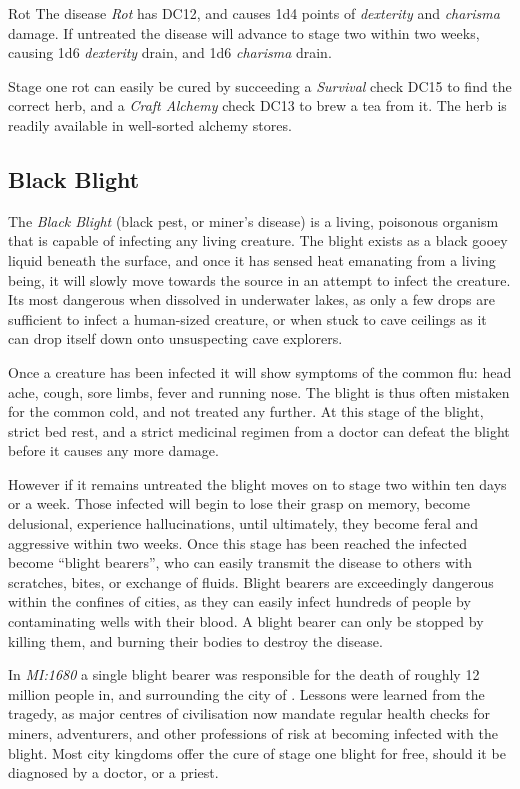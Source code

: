 \begin{35e}{Rot}
  The disease \emph{Rot} has DC12, and causes 1d4 points of \emph{dexterity}
  and \emph{charisma} damage. If untreated the disease will advance to stage
  two within two weeks, causing 1d6 \emph{dexterity} drain, and 1d6
  \emph{charisma} drain.

  Stage one rot can easily be cured by succeeding a \emph{Survival} check DC15
  to find the correct herb, and a \emph{Craft Alchemy} check DC13 to brew a
  tea from it. The herb is readily available in well-sorted alchemy stores.
\end{35e}


\subsection{Black Blight}
\label{sec:Black Blight}

The \emph{Black Blight} (black pest, or miner's disease) is a living,
poisonous organism that is capable of infecting any living creature. The
blight exists as a black gooey liquid beneath the surface, and once it has
sensed heat emanating from a living being, it will slowly move towards the
source in an attempt to infect the creature. Its most dangerous when dissolved
in underwater lakes, as only a few drops are sufficient to infect a
human-sized creature, or when stuck to cave ceilings as it can drop itself
down onto unsuspecting cave explorers.

Once a creature has been infected it will show symptoms of the common flu:
head ache, cough, sore limbs, fever and running nose. The blight is thus
often mistaken for the common cold, and not treated any further. At this
stage of the blight, strict bed rest, and a strict medicinal regimen from
a doctor can defeat the blight before it causes any more damage.

However if it remains untreated the blight moves on to stage two within ten
days or a week. Those infected will begin to lose their grasp on memory,
become delusional, experience hallucinations, until ultimately, they become
feral and aggressive within two weeks. Once this stage has been reached the
infected become ``blight bearers'', who can easily transmit the disease to
others with scratches, bites, or exchange of fluids. Blight bearers are
exceedingly dangerous within the confines of cities, as they can easily infect
hundreds of people by contaminating wells with their blood. A blight bearer
can only be stopped by killing them, and burning their bodies to destroy
the disease.

In \emph{MI:1680} a single blight bearer was responsible for the death of
roughly 12 million people in, and surrounding the city of
. Lessons were learned from the tragedy, as major
centres of civilisation now mandate regular health checks for miners,
adventurers, and other professions of risk at becoming infected with the
blight. Most city kingdoms offer the cure of stage one blight for free,
should it be diagnosed by a doctor, or a priest.
